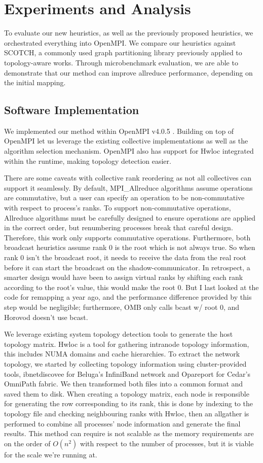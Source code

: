 \section{Experiments and Analysis}
To evaluate our new heuristics, as well as the previously proposed heuristics, we orchestrated everything into OpenMPI.
We compare our heuristics against SCOTCH, a commonly used graph partitioning library previously applied to topology-aware works.
Through microbenchmark evaluation, we are able to demonstrate that our method can improve allreduce performance, depending on the initial mapping.

\subsection{Software Implementation}
We implemented our method within OpenMPI v4.0.5 \cite{gabriel2004OpenMPI}.
Building on top of OpenMPI let us leverage the existing collective implementations as well as the algorithm selection mechanism.
OpenMPI also has support for Hwloc integrated within the runtime, making topology detection easier.

There are some caveats with collective rank reordering as not all collectives can support it seamlessly.
By default, MPI\_Allreduce algorithms assume operations are commutative, but a user can specify an operation to be non-commutative with respect to process's ranks. 
To support non-commutative operations, Allreduce algorithms must be carefully designed to ensure operations are applied in the correct order, but renumbering processes break that careful design.
Therefore, this work only supports commutative operations.
Furthermore, both broadcast heuristics assume rank 0 is the root which is not always true. 
So when rank 0 isn't the broadcast root, it needs to receive the data from the real root before it can start the broadcast on the shadow-communicator.
In retrospect, a smarter design would have been to assign virtual ranks by shifting each rank according to the root's value, this would make the root 0.
But I last looked at the code for remapping a year ago, and the performance difference provided by this step would be negligible; furthermore, OMB only calls bcast w/ root 0, and Horovod doesn't use bcast.

We leverage existing system topology detection tools to generate the host topology matrix.
Hwloc \cite{Broquedis2010hwloc} is a tool for gathering intranode topology information, this includes NUMA domains and cache hierarchies.
To extract the network topology, we started by collecting topology information using cluster-provided tools, ibnetdiscovee for Beluga's InfiniBand network and Opareport for Cedar's OmniPath fabric.
We then transformed both files into a common format and saved them to disk.
When creating a topology matrix, each node is responsible for generating the row corresponding to its rank, this is done by indexing to the topology file and checking neighbouring ranks with Hwloc, then an allgather is performed to combine all processes' node information and generate the final results.
This method can require is not scalable as the memory requirements are on the order of $O(n^2)$ with respect to the number of processes, but it is viable for the scale we're running at.

